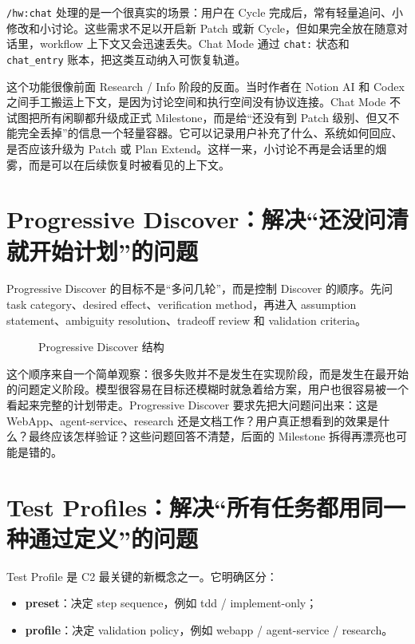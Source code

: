 \documentclass[
  outputdir=build,
  chapterstyle=cn,
  colorscheme=Simple,
  fontset=tech,
  code=false
]{Hypo-Note}
\begin{document}
\texttt{/hw:chat} 处理的是一个很真实的场景：用户在 Cycle 完成后，常有轻量追问、小修改和小讨论。这些需求不足以开启新 Patch 或新 Cycle，但如果完全放在随意对话里，workflow 上下文又会迅速丢失。Chat Mode 通过 \texttt{chat:} 状态和 \texttt{chat\_entry} 账本，把这类互动纳入可恢复轨道。

这个功能很像前面 Research / Info 阶段的反面。当时作者在 Notion AI 和 Codex 之间手工搬运上下文，是因为讨论空间和执行空间没有协议连接。Chat Mode 不试图把所有闲聊都升级成正式 Milestone，而是给“还没有到 Patch 级别、但又不能完全丢掉”的信息一个轻量容器。它可以记录用户补充了什么、系统如何回应、是否应该升级为 Patch 或 Plan Extend。这样一来，小讨论不再是会话里的烟雾，而是可以在后续恢复时被看见的上下文。

\section{Progressive Discover：解决“还没问清就开始计划”的问题}

Progressive Discover 的目标不是“多问几轮”，而是控制 Discover 的顺序。先问 task category、desired effect、verification method，再进入 assumption statement、ambiguity resolution、tradeoff review 和 validation criteria。

\begin{figure}[H]
  \centering
  
  \caption{Progressive Discover 结构}
\end{figure}

这个顺序来自一个简单观察：很多失败并不是发生在实现阶段，而是发生在最开始的问题定义阶段。模型很容易在目标还模糊时就急着给方案，用户也很容易被一个看起来完整的计划带走。Progressive Discover 要求先把大问题问出来：这是 WebApp、agent-service、research 还是文档工作？用户真正想看到的效果是什么？最终应该怎样验证？这些问题回答不清楚，后面的 Milestone 拆得再漂亮也可能是错的。

\section{Test Profiles：解决“所有任务都用同一种通过定义”的问题}

Test Profile 是 C2 最关键的新概念之一。它明确区分：

\begin{itemize}[leftmargin=2em]
  \item \textbf{preset}：决定 step sequence，例如 tdd / implement-only；
  \item \textbf{profile}：决定 validation policy，例如 webapp / agent-service / research。
\end{itemize}
\end{document}
